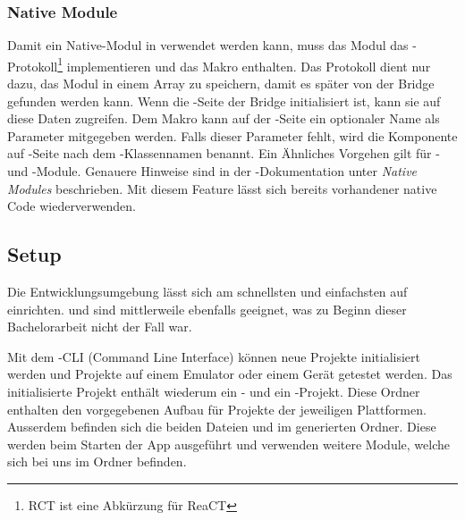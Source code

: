\subsubsection{Native Module}
Damit ein  Native-Modul in  verwendet werden kann, muss das Modul das -Protokoll\footnote{RCT ist eine Abkürzung für ReaCT} implementieren und das Makro  enthalten. 
Das Protokoll dient nur dazu, das Modul in einem Array zu speichern, damit es später von der Bridge gefunden werden kann. 
Wenn die -Seite der Bridge initialisiert ist, kann sie auf diese Daten zugreifen. 
Dem Makro kann auf der -Seite ein optionaler Name als Parameter mitgegeben werden. 
Falls dieser Parameter fehlt, wird die Komponente auf -Seite nach dem -Klassennamen benannt. 
Ein Ähnliches Vorgehen gilt für - und -Module. 
Genauere Hinweise sind in der -Dokumentation unter \textit{Native Modules} beschrieben.\cite{react-native-module-ios}\cite{react-native-module-android}
Mit diesem Feature lässt sich bereits vorhandener native Code wiederverwenden. 


\subsection{Setup}
Die Entwicklungsumgebung lässt sich am schnellsten und einfachsten auf  einrichten. 
 und  sind mittlerweile ebenfalls geeignet, was zu Beginn dieser Bachelorarbeit nicht der Fall war. 

Mit dem -CLI (Command Line Interface) können neue Projekte initialisiert werden und Projekte auf einem Emulator oder einem Gerät getestet werden. 
Das initialisierte Projekt enthält wiederum ein - und ein -Projekt.
Diese Ordner enthalten den vorgegebenen Aufbau für Projekte der jeweiligen Plattformen.
Ausserdem befinden sich die beiden Dateien  und  im generierten Ordner.
Diese werden beim Starten der App ausgeführt und verwenden weitere  Module, welche sich bei uns im  Ordner befinden.

